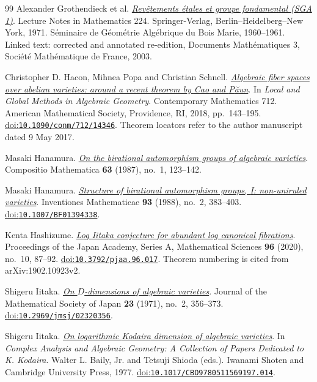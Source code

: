 \begin{thebibliography}{99}
Alexander Grothendieck et al.
\emph{\href{https://arxiv.org/abs/math/0206203v2}{Rev{\^e}tements {\'e}tales et groupe fondamental ({SGA} 1)}}.
Lecture Notes in Mathematics 224.
Springer-Verlag, Berlin--Heidelberg--New York, 1971.
S{\'e}minaire de G{\'e}om{\'e}trie Alg{\'e}brique du Bois Marie,
1960--1961. Linked text: corrected and annotated re-edition,
Documents Math{\'e}matiques 3, Soci{\'e}t{\'e} Math{\'e}matique de France, 2003.

Christopher D. Hacon, Mihnea Popa and Christian Schnell.
\emph{\href{https://people.math.harvard.edu/~mpopa/papers/HPS.pdf}{Algebraic fiber spaces over abelian varieties: around a recent theorem by {Cao} and {P{\u a}un}}}.
In \emph{Local and Global Methods in Algebraic Geometry}.
Contemporary Mathematics 712.
American Mathematical Society, Providence, RI, 2018, pp.~143--195.
\href{https://doi.org/10.1090/conm/712/14346}{doi:\nolinkurl{10.1090/conm/712/14346}}.
Theorem locators refer to the author manuscript dated 9 May 2017.

Masaki Hanamura.
\emph{\href{https://www.numdam.org/item/CM_1987__63_1_123_0.pdf}{On the birational automorphism groups of algebraic varieties}}.
Compositio Mathematica \textbf{63} (1987), no.~1, 123--142.

Masaki Hanamura.
\emph{\href{https://doi.org/10.1007/BF01394338}{Structure of birational automorphism groups, {I}: non-uniruled varieties}}.
Inventiones Mathematicae \textbf{93} (1988), no.~2, 383--403.
\href{https://doi.org/10.1007/BF01394338}{doi:\nolinkurl{10.1007/BF01394338}}.

Kenta Hashizume.
\emph{\href{https://arxiv.org/abs/1902.10923v2}{Log {Iitaka} conjecture for abundant log canonical fibrations}}.
Proceedings of the Japan Academy, Series A, Mathematical Sciences \textbf{96} (2020), no.~10, 87--92.
\href{https://doi.org/10.3792/pjaa.96.017}{doi:\nolinkurl{10.3792/pjaa.96.017}}.
Theorem numbering is cited from arXiv:1902.10923v2.

Shigeru Iitaka.
\emph{\href{https://www.jstage.jst.go.jp/article/jmath1948/23/2/23_2_356/_article}{On {$D$}-dimensions of algebraic varieties}}.
Journal of the Mathematical Society of Japan \textbf{23} (1971), no.~2, 356--373.
\href{https://doi.org/10.2969/jmsj/02320356}{doi:\nolinkurl{10.2969/jmsj/02320356}}.

Shigeru Iitaka.
\emph{\href{https://doi.org/10.1017/CBO9780511569197.014}{On logarithmic {Kodaira} dimension of algebraic varieties}}.
In \emph{Complex Analysis and Algebraic Geometry: A Collection of Papers Dedicated to {K. Kodaira}}.
Walter L. Baily, Jr. and Tetsuji Shioda (eds.).
Iwanami Shoten and Cambridge University Press, 1977.
\href{https://doi.org/10.1017/CBO9780511569197.014}{doi:\nolinkurl{10.1017/CBO9780511569197.014}}.


\end{thebibliography}
